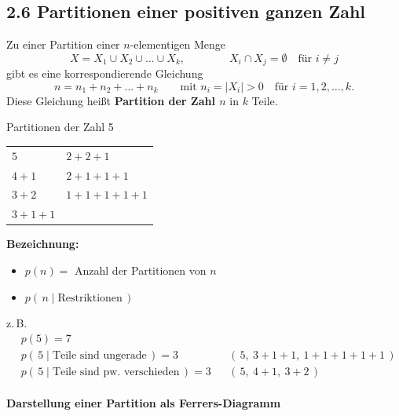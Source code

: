 \subsection{2.6 Partitionen einer positiven ganzen Zahl}

\begin{definition}
Zu einer Partition einer $n$-elementigen Menge
\[
X = X_1 \cup X_2 \cup \dots \cup X_k, \qquad\qquad X_i \cap X_j = \emptyset \quad \text{für } i \neq j
\]
gibt es eine korrespondierende Gleichung
\[
n = n_1 + n_2 + \dots + n_k \qquad \text{mit } n_i = |X_i| > 0 \quad \text{für } i = 1, 2, \dots, k.
\]
Diese Gleichung heißt \textbf{Partition der Zahl $n$} in $k$ Teile.
\end{definition}

\begin{beispiel}
Partitionen der Zahl 5
\begin{center}
\begin{tabular}{ll}
$5$ & $2+2+1$ \\
$4+1$ & $2+1+1+1$ \\
$3+2$ & $1+1+1+1+1$ \\
$3+1+1$ & \\
\end{tabular}
\end{center}
\end{beispiel}

\textbf{Bezeichnung:}
\begin{itemize}
\item[-] $p(n) =$ Anzahl der Partitionen von $n$
\item[-] $p(\,n \mid \text{Restriktionen}\,)$
\end{itemize}
z.\,B.
\begin{align*}
&p(5) = 7 \\
&p(\,5 \mid \text{Teile sind ungerade}\,) = 3 && (\,5,\ 3+1+1,\ 1+1+1+1+1\,) \\
&p(\,5 \mid \text{Teile sind pw.\ verschieden}\,) = 3 && (\,5,\ 4+1,\ 3+2\,)
\end{align*}

\paragraph{Darstellung einer Partition als Ferrers-Diagramm}

